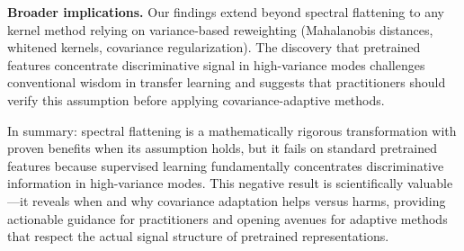 \documentclass[11pt]{article}
\begin{document}
\textbf{Broader implications.} Our findings extend beyond spectral flattening to any kernel method relying on variance-based reweighting (Mahalanobis distances, whitened kernels, covariance regularization). The discovery that pretrained features concentrate discriminative signal in high-variance modes challenges conventional wisdom in transfer learning and suggests that practitioners should verify this assumption before applying covariance-adaptive methods.

In summary: spectral flattening is a mathematically rigorous transformation with proven benefits when its assumption holds, but it fails on standard pretrained features because supervised learning fundamentally concentrates discriminative information in high-variance modes. This negative result is scientifically valuable---it reveals when and why covariance adaptation helps versus harms, providing actionable guidance for practitioners and opening avenues for adaptive methods that respect the actual signal structure of pretrained representations.
\end{document}

